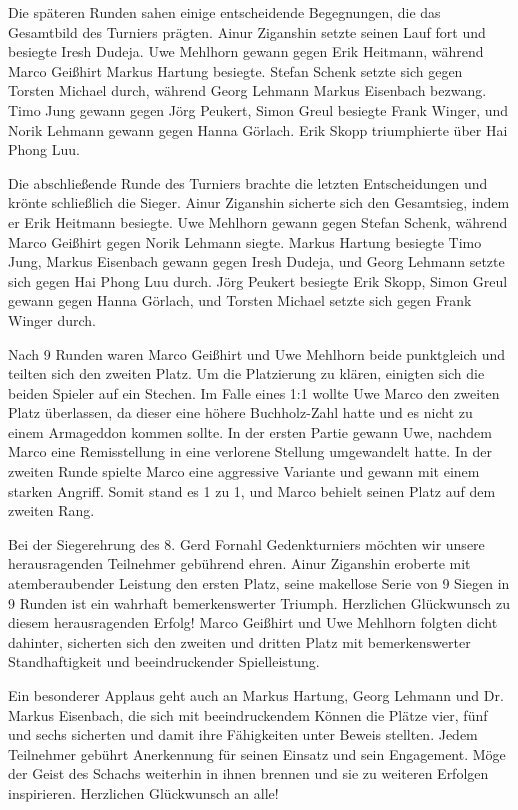 \documentclass[a4paper,ngerman]{tui-algo-seminar}
\begin{document}
Die späteren Runden sahen einige entscheidende Begegnungen, die das Gesamtbild des Turniers prägten. Ainur Ziganshin setzte seinen Lauf fort und besiegte Iresh Dudeja. Uwe Mehlhorn gewann gegen Erik Heitmann, während Marco Geißhirt Markus Hartung besiegte. Stefan Schenk setzte sich gegen Torsten Michael durch, während Georg Lehmann Markus Eisenbach bezwang. Timo Jung gewann gegen Jörg Peukert, Simon Greul besiegte Frank Winger, und Norik Lehmann gewann gegen Hanna Görlach. Erik Skopp triumphierte über Hai Phong Luu.

Die abschließende Runde des Turniers brachte die letzten Entscheidungen und krönte schließlich die Sieger. Ainur Ziganshin sicherte sich den Gesamtsieg, indem er Erik Heitmann besiegte. Uwe Mehlhorn gewann gegen Stefan Schenk, während Marco Geißhirt gegen Norik Lehmann siegte. Markus Hartung besiegte Timo Jung, Markus Eisenbach gewann gegen Iresh Dudeja, und Georg Lehmann setzte sich gegen Hai Phong Luu durch. Jörg Peukert besiegte Erik Skopp, Simon Greul gewann gegen Hanna Görlach, und Torsten Michael setzte sich gegen Frank Winger durch.

Nach 9 Runden waren Marco Geißhirt und Uwe Mehlhorn beide punktgleich und teilten sich den zweiten Platz. Um die Platzierung zu klären, einigten sich die beiden Spieler auf ein Stechen. Im Falle eines 1:1 wollte Uwe Marco den zweiten Platz überlassen, da dieser eine höhere Buchholz-Zahl hatte und es nicht zu einem Armageddon kommen sollte. In der ersten Partie gewann Uwe, nachdem Marco eine Remisstellung in eine verlorene Stellung umgewandelt hatte. In der zweiten Runde spielte Marco eine aggressive Variante und gewann mit einem starken Angriff. Somit stand es 1 zu 1, und Marco behielt seinen Platz auf dem zweiten Rang. ~\cite{marco1}

Bei der Siegerehrung des 8. Gerd Fornahl Gedenkturniers möchten wir unsere herausragenden Teilnehmer gebührend ehren. Ainur Ziganshin eroberte mit atemberaubender Leistung den ersten Platz, seine makellose Serie von 9 Siegen in 9 Runden ist ein wahrhaft bemerkenswerter Triumph. Herzlichen Glückwunsch zu diesem herausragenden Erfolg! Marco Geißhirt und Uwe Mehlhorn folgten dicht dahinter, sicherten sich den zweiten und dritten Platz mit bemerkenswerter Standhaftigkeit und beeindruckender Spielleistung.

Ein besonderer Applaus geht auch an Markus Hartung, Georg Lehmann und Dr. Markus Eisenbach, die sich mit beeindruckendem Können die Plätze vier, fünf und sechs sicherten und damit ihre Fähigkeiten unter Beweis stellten. Jedem Teilnehmer gebührt Anerkennung für seinen Einsatz und sein Engagement. Möge der Geist des Schachs weiterhin in ihnen brennen und sie zu weiteren Erfolgen inspirieren. Herzlichen Glückwunsch an alle!
\end{document}
